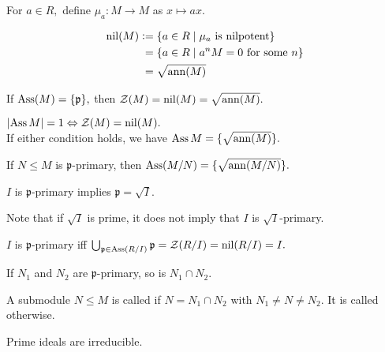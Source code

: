 \documentclass[12pt]{article}	%
\DeclareMathOperator{\nil}{nil}
\begin{document}
\begin{defn}%
	For $a \in R,$ define $\mu_a : M \to M$ as $x \mapsto ax.$
\end{defn}

\begin{defn}%
	\begin{align*} 
		\nil(M) \vcentcolon=&\; \{a \in R \mid \mu_a \text{ is nilpotent}\}\\
		=&\; \{a \in R \mid a^nM = 0 \text{ for some } n\}\\
		=&\; \sqrt{\ann(M)}
	\end{align*}
\end{defn}

\begin{prop}
	If $\operatorname{Ass}(M) = \{\mathfrak{p}\},$ then $\mathcal{Z}(M) = \nil(M) = \sqrt{\ann(M)}.$
\end{prop}
\begin{thm}
	$\md{\Ass M} = 1 \Leftrightarrow \mathcal{Z}(M) = \nil(M).$\\
	If either condition holds, we have $\operatorname{Ass} M = \{\sqrt{\operatorname{ann}(M)}\}.$
\end{thm}

\begin{cor}
	If $N \le M$ is $\mathfrak{p}$-primary, then $\operatorname{Ass}(M/N) = \{\sqrt{\operatorname{ann}(M/N)}\}.$
\end{cor}
\begin{cor}
	$I$ is $\mathfrak{p}$-primary implies $\mathfrak{p} = \sqrt{I}.$
\end{cor}
\begin{rem}
	Note that if $\sqrt{I}$ is prime, it does not imply that $I$ is $\sqrt{I}$-primary.
\end{rem}
\begin{cor}
	$I$ is $\mathfrak{p}$-primary iff $\bigcup_{\mathfrak{p} \in \Ass(R/I)}\mathfrak{p} = \mathcal{Z}(R/I) = \nil(R/I) = I.$
\end{cor}

\begin{prop}
	If $N_1$ and $N_2$ are $\mathfrak{p}$-primary, so is $N_1 \cap N_2.$
\end{prop}

\begin{defn}%
	A submodule $N \le M$ is called  if $N = N_1 \cap N_2$ with $N_1 \neq N \neq N_2.$ It is called  otherwise.
\end{defn}
\begin{prop}
	Prime ideals are irreducible.
\end{prop}
\end{document}

